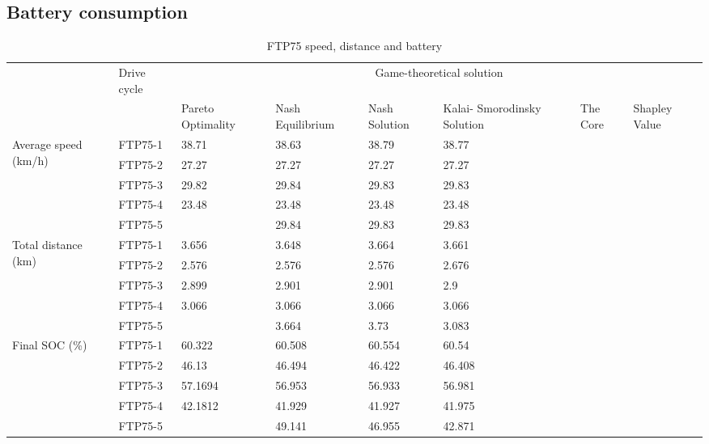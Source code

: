 \subsection{Battery consumption}

\begin{table}[h]
\centering
\begin{tabular}{ |p{1.5cm}|p{1.5cm}|p{1.3cm}|p{1.3cm}|p{1.3cm}|p{1.3cm}|p{1.3cm}|p{1.3cm}|} 
 \hline
  \cline{3-8}
   & Drive cycle & \multicolumn{6}{|c|}{Game-theoretical solution} \\
   \cline{3-8}
   & & Pareto Optimality & Nash Equilibrium & Nash Solution & Kalai- Smorodinsky Solution & The Core & Shapley Value\\
 \hline\hline
 \multirow{5}{*}{\parbox{1.5cm}{Average speed (km/h)}}
 & FTP75-1 & 38.71 & 38.63 & 38.79 & 38.77 & & \\
 & FTP75-2 & 27.27 & 27.27 & 27.27 & 27.27 & & \\ 
 & FTP75-3 & 29.82 & 29.84 & 29.83 & 29.83 & & \\ 
 & FTP75-4 & 23.48 & 23.48 & 23.48 & 23.48 & & \\ 
 & FTP75-5 & & 29.84 & 29.83 & 29.83 & & \\ 
 \hline 
 \multirow{5}{*}{\parbox{1.5cm}{Total distance (km)}}
 & FTP75-1 & 3.656 & 3.648 & 3.664 & 3.661 & & \\ 
 & FTP75-2 & 2.576 & 2.576 & 2.576 & 2.676 & & \\ 
 & FTP75-3 & 2.899 & 2.901 & 2.901 & 2.9 & & \\ 
 & FTP75-4 & 3.066 & 3.066 & 3.066 & 3.066 & & \\ 
 & FTP75-5 & & 3.664 & 3.73 & 3.083 & & \\ 
 \hline 
 \multirow{5}{*}{\parbox{1.5cm}{Final SOC (\%)}}
 & FTP75-1 & 60.322 & 60.508 & 60.554 & 60.54 & & \\ 
 & FTP75-2 & 46.13 & 46.494 & 46.422 & 46.408 & & \\ 
 & FTP75-3 & 57.1694 & 56.953 & 56.933 & 56.981 & & \\ 
 & FTP75-4 & 42.1812 & 41.929 & 41.927 & 41.975 & & \\ 
 & FTP75-5 & & 49.141 & 46.955 & 42.871 & & \\ 
 \hline

 \hline
\end{tabular}
\caption{FTP75 speed, distance and battery}
\label{tab:fuelEmis}
\end{table}
